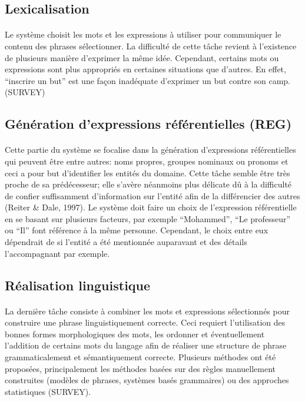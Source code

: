 	\subsection{Lexicalisation}
	\paragraph{}Le système choisit les mots et les expressions à utiliser pour communiquer le contenu des phrases sélectionner. La difficulté de cette tâche revient à l’existence de plusieurs manière d’exprimer la même idée. Cependant, certains mots ou expressions sont plus appropriés en certaines situations que d’autres. En effet, “inscrire un but” est une façon inadéquate d’exprimer un but contre son camp.(SURVEY)
	
	\subsection{Génération d’expressions référentielles (REG)}
	\paragraph{}Cette partie du système se focalise dans la génération d’expressions référentielles qui peuvent être entre autres: noms propres, groupes nominaux ou pronoms et ceci a pour but d’identifier les entités du domaine. Cette tâche semble être très proche de sa prédécesseur; elle s’avère néanmoins plus délicate dû à la difficulté de confier suffisamment d’information sur l’entité afin de la différencier des autres (Reiter \& Dale, 1997). Le système doit faire un choix de l’expression référentielle en se basant sur plusieurs facteurs, par exemple “Mohammed”, “Le professeur” ou “Il” font référence à la même personne. Cependant, le choix entre eux dépendrait de si l’entité a été mentionnée auparavant et des détails l’accompagnant par exemple. 
	
	\subsection{Réalisation linguistique}
	\paragraph{}
	La dernière tâche consiste à combiner les mots et expressions sélectionnés pour construire une phrase linguistiquement correcte. Ceci requiert l’utilisation des bonnes formes morphologiques des mots, les ordonner et éventuellement  l’addition de certains mots du langage afin de réaliser une structure de phrase grammaticalement et sémantiquement correcte. Plusieurs méthodes ont été proposées, principalement les méthodes basées sur des règles manuellement construites (modèles de phrases, systèmes basés grammaires) ou des approches statistiques (SURVEY).
